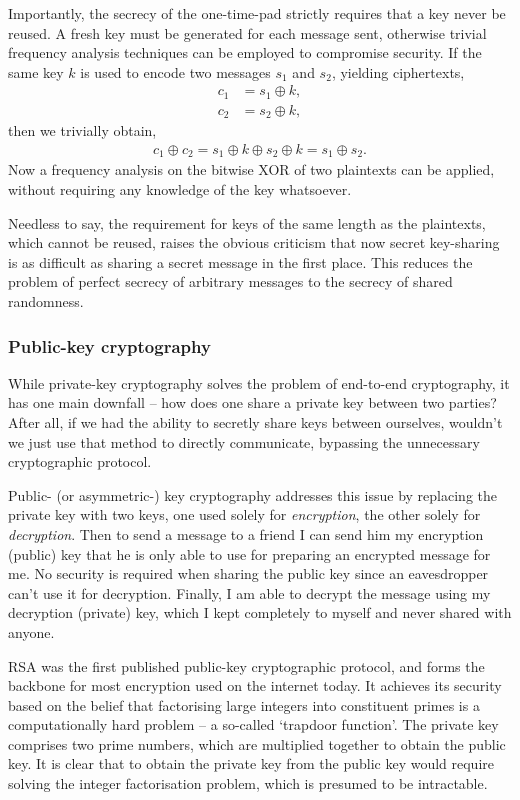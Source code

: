 Importantly, the secrecy of the one-time-pad strictly requires that a key never be reused. A fresh key must be generated for each message sent, otherwise trivial frequency analysis techniques can be employed to compromise security. If the same key $k$ is used to encode two messages $s_1$ and $s_2$, yielding ciphertexts,
\begin{align}
c_1&=s_1\oplus k,\nonumber\\
c_2&=s_2\oplus k,
\end{align}
then we trivially obtain,
\begin{align}
c_1 \oplus c_2 = s_1 \oplus k \oplus s_2 \oplus k = s_1 \oplus s_2.
\end{align}
Now a frequency analysis on the bitwise XOR of two plaintexts can be applied, without requiring any knowledge of the key whatsoever.

Needless to say, the requirement for keys of the same length as the plaintexts, which cannot be reused, raises the obvious criticism that now secret key-sharing is as difficult as sharing a secret message in the first place. This reduces the problem of perfect secrecy of arbitrary messages to the secrecy of shared randomness. 

\subsubsection{Public-key cryptography}

While private-key cryptography solves the problem of end-to-end cryptography, it has one main downfall -- how does one share a private key between two parties? After all, if we had the ability to secretly share keys between ourselves, wouldn't we just use that method to directly communicate, bypassing the unnecessary cryptographic protocol.

Public- (or asymmetric-) key cryptography addresses this issue by replacing the private key with two keys, one used solely for \textit{encryption}, the other solely for \textit{decryption}. Then to send a message to a friend I can send him my encryption (public) key that he is only able to use for preparing an encrypted message for me. No security is required when sharing the public key since an eavesdropper can't use it for decryption. Finally, I am able to decrypt the message using my decryption (private) key, which I kept completely to myself and never shared with anyone.

RSA \cite{bib:RSA} was the first published public-key cryptographic protocol, and forms the backbone for most encryption used on the internet today. It achieves its security based on the belief that factorising large integers into constituent primes is a computationally hard problem -- a so-called `trapdoor function'. The private key comprises two prime numbers, which are multiplied together to obtain the public key. It is clear that to obtain the private key from the public key would require solving the integer factorisation problem, which is presumed to be intractable.

